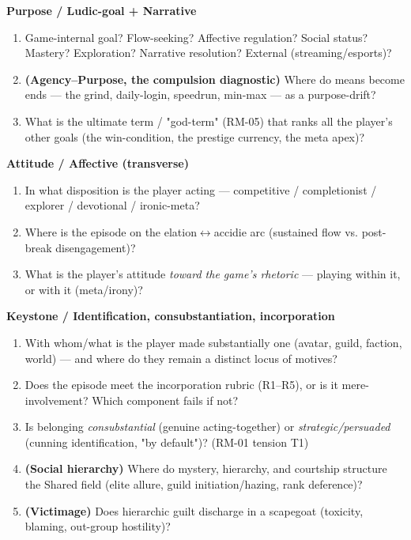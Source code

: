 \documentclass[11pt]{report}
\begin{document}
\textbf{Purpose / Ludic-goal + Narrative}

\begin{enumerate}
\item Game-internal goal? Flow-seeking? Affective regulation? Social status? Mastery? Exploration? Narrative resolution? External (streaming/esports)?
\item \textbf{(Agency–Purpose, the compulsion diagnostic)} Where do means become ends — the grind, daily-login, speedrun, min-max — as a purpose-drift?
\item What is the ultimate term / "god-term" (RM-05) that ranks all the player's other goals (the win-condition, the prestige currency, the meta apex)?
\end{enumerate}


\textbf{Attitude / Affective (transverse)}

\begin{enumerate}
\item In what disposition is the player acting — competitive / completionist / explorer / devotional / ironic-meta?
\item Where is the episode on the elation$\leftrightarrow$\allowbreak accidie arc (sustained flow vs. post-break disengagement)?
\item What is the player's attitude \textit{toward the game's rhetoric} — playing within it, or with it (meta/irony)?
\end{enumerate}


\textbf{Keystone / Identification, consubstantiation, incorporation}

\begin{enumerate}
\item With whom/what is the player made substantially one (avatar, guild, faction, world) — and where do they remain a distinct locus of motives?
\item Does the episode meet the incorporation rubric (R1–R5), or is it mere-involvement? Which component fails if not?
\item Is belonging \textit{consubstantial} (genuine acting-together) or \textit{strategic/persuaded} (cunning identification, "by default")? (RM-01 tension T1)
\item \textbf{(Social hierarchy)} Where do mystery, hierarchy, and courtship structure the Shared field (elite allure, guild initiation/hazing, rank deference)?
\item \textbf{(Victimage)} Does hierarchic guilt discharge in a scapegoat (toxicity, blaming, out-group hostility)?
\end{enumerate}
\end{document}
